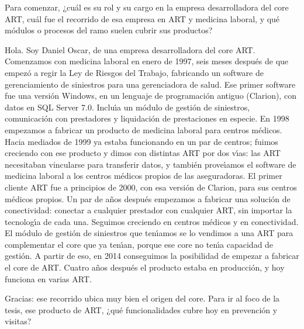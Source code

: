 \begin{description}[style=nextline, leftmargin=0cm, labelsep=0.35cm]

\item[\textbf{Entrevistador:}]
Para comenzar, ¿cu\'al es su rol y su cargo en la empresa desarrolladora del core ART, cu\'al fue el recorrido de esa empresa en ART y medicina laboral, y qu\'e m\'odulos o procesos del ramo suelen cubrir sus productos?

\item[\textbf{Entrevistado:}]
Hola.
Soy Daniel Oscar, de una empresa desarrolladora del core ART.
Comenzamos con medicina laboral en enero de 1997, seis meses despu\'es de que empez\'o a regir la Ley de Riesgos del Trabajo, fabricando un software de gerenciamiento de siniestros para una gerenciadora de salud.
Ese primer software fue una versi\'on Windows, en un lenguaje de programaci\'on antiguo (Clarion), con datos en SQL Server 7.0.
Inclu\'{\i}a un m\'odulo de gesti\'on de siniestros, comunicaci\'on con prestadores y liquidaci\'on de prestaciones en especie.
En 1998 empezamos a fabricar un producto de medicina laboral para centros m\'edicos.
Hacia mediados de 1999 ya estaba funcionando en un par de centros; fuimos creciendo con ese producto y dimos con distintas ART por dos v\'{\i}as: las ART necesitaban vincularse para transferir datos, y tambi\'en prove\'{\i}amos el software de medicina laboral a los centros m\'edicos propios de las aseguradoras.
El primer cliente ART fue a principios de 2000, con esa versi\'on de Clarion, para sus centros m\'edicos propios.
Un par de a\~nos despu\'es empezamos a fabricar una soluci\'on de conectividad: conectar a cualquier prestador con cualquier ART, sin importar la tecnolog\'{\i}a de cada una.
Seguimos creciendo en centros m\'edicos y en conectividad.
El m\'odulo de gesti\'on de siniestros que ten\'{\i}amos se lo vendimos a una ART para complementar el core que ya ten\'{\i}an, porque ese core no ten\'{\i}a capacidad de gesti\'on.
A partir de eso, en 2014 conseguimos la posibilidad de empezar a fabricar el core de ART.
Cuatro a\~nos despu\'es el producto estaba en producci\'on, y hoy funciona en varias ART.

\item[\textbf{Entrevistador:}]
Gracias: ese recorrido ubica muy bien el origen del core.
Para ir al foco de la tesis, ese producto de ART, ¿qu\'e funcionalidades cubre hoy en prevenci\'on y visitas?


\end{description}
